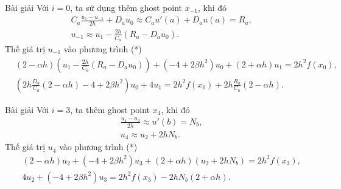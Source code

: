 \documentclass[9pt]{beamer}
\begin{document}
\begin{frame}
    \begin{exampleblock}{Bài giải}
    Với $i = 0$, ta sử dụng thêm ghost point $x_{-1}$, khi đó
    \begin{align*}
        & C_a \frac{u_1 - u_{-1}}{2h} + D_a u_0 \approx C_a u'(a) + D_a u(a) = R_a, \\
        & u_{-1} \approx u_1 - \frac{2h}{C_a}(R_a - D_a u_0).
    \end{align*}
    Thế giá trị $u_{-1}$ vào phương trình (*)
    \begin{align*}
        & (2 - \alpha h) \left(u_1 - \frac{2h}{C_a}(R_a - D_a u_0)\right) + (-4 + 2\beta h^2)u_0 + (2 + \alpha h)u_1 = 2h^2f(x_0), \\
        & \left(2h\frac{D_a}{C_a}(2 - \alpha h) - 4 + 2\beta h^2\right)u_0 + 4u_1 = 2h^2f(x_0) + 2h\frac{R_a}{C_a}(2 - \alpha h).
    \end{align*}
    \end{exampleblock}
\end{frame}

\begin{frame}
    \begin{exampleblock}{Bài giải}
    Với $i = 3$, ta thêm ghost point $x_4$, khi đó
    \begin{align*}
        & \frac{u_4 - u_2}{2h} \approx u'(b) = N_b, \\
        & u_4 \approx u_2 + 2hN_b.
    \end{align*}
    Thế giá trị $u_4$ vào phương trình (*)
    \begin{align*}
        & (2 - \alpha h) u_2 + (-4 + 2\beta h^2) u_3 + (2 + \alpha h)(u_2 + 2hN_b) = 2h^2f(x_3), \\
        & 4 u_2 + (-4 + 2\beta h^2) u_3 = 2h^2 f(x_3) - 2hN_b(2 + \alpha h).
    \end{align*}
    \end{exampleblock}    
\end{frame}
\end{document}
